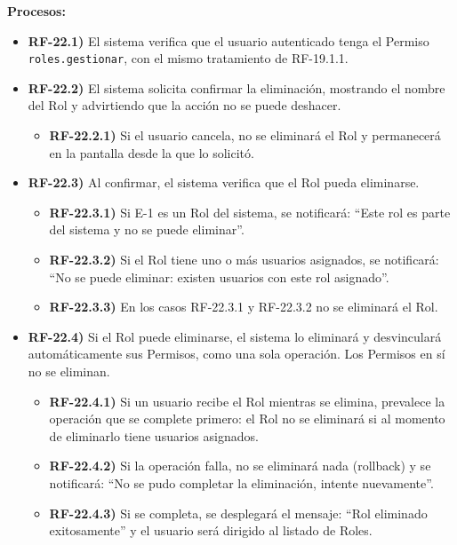 \textbf{Procesos:}
\begin{itemize}[label={}, leftmargin=1.5em]
  \item \textbf{RF-22.1)} El sistema verifica que el usuario autenticado tenga el Permiso \texttt{roles.gestionar}, con el mismo tratamiento de RF-19.1.1.
  \item \textbf{RF-22.2)} El sistema solicita confirmar la eliminaci\'on, mostrando el nombre del Rol y advirtiendo que la acci\'on no se puede deshacer.
  \begin{itemize}[label={}, leftmargin=1.5em]
    \item \textbf{RF-22.2.1)} Si el usuario cancela, no se eliminar\'a el Rol y permanecer\'a en la pantalla desde la que lo solicit\'o.
  \end{itemize}
  \item \textbf{RF-22.3)} Al confirmar, el sistema verifica que el Rol pueda eliminarse.
  \begin{itemize}[label={}, leftmargin=1.5em]
    \item \textbf{RF-22.3.1)} Si E-1 es un Rol del sistema, se notificar\'a: ``Este rol es parte del sistema y no se puede eliminar''.
    \item \textbf{RF-22.3.2)} Si el Rol tiene uno o m\'as usuarios asignados, se notificar\'a: ``No se puede eliminar: existen usuarios con este rol asignado''.
    \item \textbf{RF-22.3.3)} En los casos RF-22.3.1 y RF-22.3.2 no se eliminar\'a el Rol.
  \end{itemize}
  \item \textbf{RF-22.4)} Si el Rol puede eliminarse, el sistema lo eliminar\'a y desvincular\'a autom\'aticamente sus Permisos, como una sola operaci\'on. Los Permisos en s\'i no se eliminan.
  \begin{itemize}[label={}, leftmargin=1.5em]
    \item \textbf{RF-22.4.1)} Si un usuario recibe el Rol mientras se elimina, prevalece la operaci\'on que se complete primero: el Rol no se eliminar\'a si al momento de eliminarlo tiene usuarios asignados.
    \item \textbf{RF-22.4.2)} Si la operaci\'on falla, no se eliminar\'a nada (rollback) y se notificar\'a: ``No se pudo completar la eliminaci\'on, intente nuevamente''.
    \item \textbf{RF-22.4.3)} Si se completa, se desplegar\'a el mensaje: ``Rol eliminado exitosamente'' y el usuario ser\'a dirigido al listado de Roles.
  \end{itemize}
\end{itemize}

